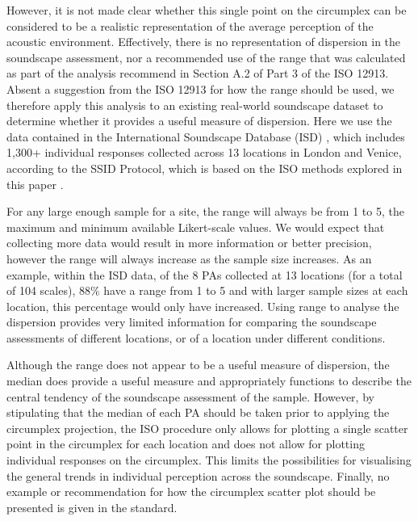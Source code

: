 \documentclass[
  authoryear,
  preprint,
  3p]{elsarticle}
\begin{document}
However, it is not made clear whether this single point on the
circumplex can be considered to be a realistic representation of the
average perception of the acoustic environment. Effectively, there is no
representation of dispersion in the soundscape assessment, nor a
recommended use of the range that was calculated as part of the analysis
recommend in Section A.2 of Part 3 of the ISO 12913. Absent a suggestion
from the ISO 12913 for how the range should be used, we therefore apply
this analysis to an existing real-world soundscape dataset to determine
whether it provides a useful measure of dispersion. Here we use the data
contained in the International Soundscape Database (ISD)
\citep{Mitchell2021International}, which includes 1,300+ individual
responses collected across 13 locations in London and Venice, according
to the SSID Protocol, which is based on the ISO methods explored in this
paper \citep{Mitchell2020Protocol}.

For any large enough sample for a site, the range will always be from 1
to 5, the maximum and minimum available Likert-scale values. We would
expect that collecting more data would result in more information or
better precision, however the range will always increase as the sample
size increases. As an example, within the ISD data, of the 8 PAs
collected at 13 locations (for a total of 104 scales), 88\% have a range
from 1 to 5 and with larger sample sizes at each location, this
percentage would only have increased. Using range to analyse the
dispersion provides very limited information for comparing the
soundscape assessments of different locations, or of a location under
different conditions.

Although the range does not appear to be a useful measure of dispersion,
the median does provide a useful measure and appropriately functions to
describe the central tendency of the soundscape assessment of the
sample. However, by stipulating that the median of each PA should be
taken prior to applying the circumplex projection, the ISO procedure
only allows for plotting a single scatter point in the circumplex for
each location and does not allow for plotting individual responses on
the circumplex. This limits the possibilities for visualising the
general trends in individual perception across the soundscape. Finally,
no example or recommendation for how the circumplex scatter plot should
be presented is given in the standard.
\end{document}
